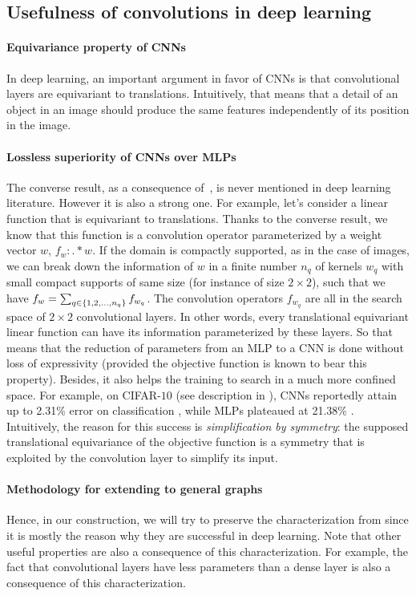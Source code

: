 \subsection{Usefulness of convolutions in deep learning}
\label{sec:cnnvsmlp}

\paragraph{Equivariance property of CNNs}
In deep learning, an important argument in favor of CNNs is that convolutional layers are equivariant to translations. Intuitively, that means that a detail of an object in an image should produce the same features independently of its position in the image.

\paragraph{Lossless superiority of CNNs over MLPs}
The converse result, as a consequence of~, is never mentioned in deep learning literature. However it is also a strong one. For example, let's consider a linear function that is equivariant to translations. Thanks to the converse result, we know that this function is a convolution operator parameterized by a weight vector $w$, $f_w : . \ast w$. If the domain is compactly supported, as in the case of images, we can break down the information of $w$ in a finite number $n_q$ of kernels $w_q$  with small compact supports of same size (for instance of size $2 \times 2$), such that we have $f_w = \sum_{q \in \{1, 2, \ldots, n_q\}} f_{w_q}$. The convolution operators $f_{w_q}$ are all in the search space of $2 \times 2$ convolutional layers. In other words, every translational equivariant linear function can have its information parameterized by these layers. So that means that the reduction of parameters from an MLP to a CNN is done without loss of expressivity (provided the objective function is known to bear this property). Besides, it also helps the training to search in a much more confined space. For example, on CIFAR-$10$ (see description in ), CNNs reportedly attain up to 2.31\% error on classification \citep{yamada2018shakedrop}, while MLPs plateaued at 21.38\% \citep{lin2015}. Intuitively, the reason for this success is \emph{simplification by symmetry}: the supposed translational equivariance of the objective function is a symmetry that is exploited by the convolution layer to simplify its input.

\paragraph{Methodology for extending to general graphs}
Hence, in our construction, we will try to preserve the characterization from  since it is mostly the reason why they are successful in deep learning. Note that other useful properties are also a consequence of this characterization. For example, the fact that convolutional layers have less parameters than a dense layer is also a consequence of this characterization.







